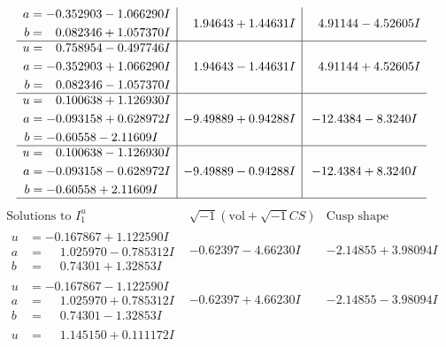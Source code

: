 \documentclass[1p]{elsarticle_modified}
\theoremstyle{definition}
\newcommand{\I}{\sqrt{-1}}
\begin{document}
$$\begin{array}{c|c|c}
\begin{aligned}
a &= -0.352903 - 1.066290 I \\
b &= \phantom{-}0.082346 + 1.057370 I\end{aligned}
 & \phantom{-}1.94643 + 1.44631 I & \phantom{-}4.91144 - 4.52605 I \\ \hline\begin{aligned}
u &= \phantom{-}0.758954 - 0.497746 I \\
a &= -0.352903 + 1.066290 I \\
b &= \phantom{-}0.082346 - 1.057370 I\end{aligned}
 & \phantom{-}1.94643 - 1.44631 I & \phantom{-}4.91144 + 4.52605 I \\ \hline\begin{aligned}
u &= \phantom{-}0.100638 + 1.126930 I \\
a &= -0.093158 + 0.628972 I \\
b &= -0.60558 - 2.11609 I\end{aligned}
 & -9.49889 + 0.94288 I & -12.4384 - 8.3240 I \\ \hline\begin{aligned}
u &= \phantom{-}0.100638 - 1.126930 I \\
a &= -0.093158 - 0.628972 I \\
b &= -0.60558 + 2.11609 I\end{aligned}
 & -9.49889 - 0.94288 I & -12.4384 + 8.3240 I\\
 \hline 
 \end{array}$$\newpage$$\begin{array}{c|c|c}  
\text{Solutions to }I^u_{1}& \I (\text{vol} + \sqrt{-1}CS) & \text{Cusp shape}\\
 \hline 
\begin{aligned}
u &= -0.167867 + 1.122590 I \\
a &= \phantom{-}1.025970 - 0.785312 I \\
b &= \phantom{-}0.74301 + 1.32853 I\end{aligned}
 & -0.62397 - 4.66230 I & -2.14855 + 3.98094 I \\ \hline\begin{aligned}
u &= -0.167867 - 1.122590 I \\
a &= \phantom{-}1.025970 + 0.785312 I \\
b &= \phantom{-}0.74301 - 1.32853 I\end{aligned}
 & -0.62397 + 4.66230 I & -2.14855 - 3.98094 I \\ \hline\begin{aligned}
u &= \phantom{-}1.145150 + 0.111172 I \\

\end{aligned}
\end{array}$$
\end{document}

